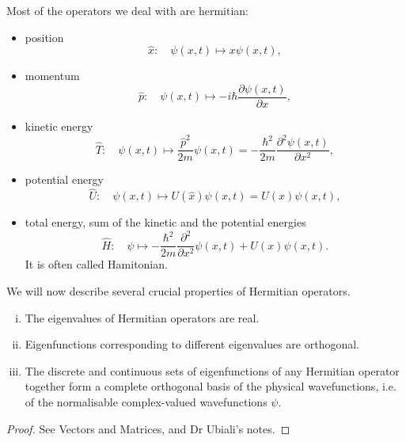 \documentclass[a4paper]{article}
\begin{document}
Most of the operators we deal with are hermitian: 
\begin{example}
    \begin{itemize}
        \item position
        \[
        \hat{x}: \quad \psi(x, t) \mapsto x \psi(x, t),
        \]
        \item momentum
        \[
        \hat{p}: \quad \psi(x, t) \mapsto-i \hbar \frac{\partial \psi(x, t)}{\partial x} ,
        \]
        \item kinetic energy
        \[
        \hat{T}: \quad \psi(x, t) \mapsto \frac{\hat{p}^2}{2 m} \psi(x, t)=-\frac{\hbar^2}{2 m} \frac{\partial^2 \psi(x, t)}{\partial x^2},
        \]
        \item potential energy
        \[
        \hat{U}: \quad \psi(x, t) \mapsto U(\hat{x}) \psi(x, t)=U(x) \psi(x, t),
        \]
        \item total energy, sum of the kinetic and the potential energies
        \[
        \hat{H}: \quad \psi \mapsto-\frac{\hbar^2}{2 m} \frac{\partial^2}{\partial x^2} \psi(x, t)+U(x) \psi(x, t) .
        \]
        It is often called Hamitonian. 
    \end{itemize}
\end{example}

We will now describe several crucial properties of Hermitian operators.

\begin{theorem}
    \begin{enumerate}[(i)]
        \item The eigenvalues of Hermitian operators are real. 
        \item Eigenfunctions corresponding to different eigenvalues are orthogonal. 
        \item The discrete and continuous sets of eigenfunctions of any Hermitian operator together form a complete orthogonal basis of the physical wavefunctions, i.e. of the normalisable complex-valued wavefunctions $ \psi $. 
    \end{enumerate}
\end{theorem}
\begin{proof}
    See Vectors and Matrices, and Dr Ubiali's notes. 
\end{proof}
\end{document}
